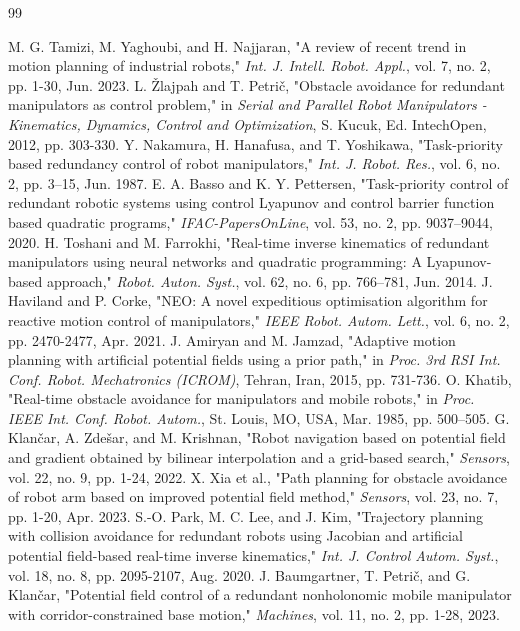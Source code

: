 \documentclass[letterpaper, 10 pt, conference]{ieeeconf}  %
\begin{document}
\begin{thebibliography}{99}
	
 M. G. Tamizi, M. Yaghoubi, and H. Najjaran, "A review of recent trend in motion planning of industrial robots," \textit{Int. J. Intell. Robot. Appl.}, vol. 7, no. 2, pp. 1-30, Jun. 2023.
 L. Žlajpah and T. Petrič, "Obstacle avoidance for redundant manipulators as control problem," in \textit{Serial and Parallel Robot Manipulators - Kinematics, Dynamics, Control and Optimization}, S. Kucuk, Ed. IntechOpen, 2012, pp. 303-330.
 Y. Nakamura, H. Hanafusa, and T. Yoshikawa, "Task-priority based redundancy control of robot manipulators," \textit{Int. J. Robot. Res.}, vol. 6, no. 2, pp. 3–15, Jun. 1987.
 E. A. Basso and K. Y. Pettersen, "Task-priority control of redundant robotic systems using control Lyapunov and control barrier function based quadratic programs," \textit{IFAC-PapersOnLine}, vol. 53, no. 2, pp. 9037–9044, 2020.
 H. Toshani and M. Farrokhi, "Real-time inverse kinematics of redundant manipulators using neural networks and quadratic programming: A Lyapunov-based approach," \textit{Robot. Auton. Syst.}, vol. 62, no. 6, pp. 766–781, Jun. 2014.
 J. Haviland and P. Corke, "NEO: A novel expeditious optimisation algorithm for reactive motion control of manipulators," \textit{IEEE Robot. Autom. Lett.}, vol. 6, no. 2, pp. 2470-2477, Apr. 2021.
 J. Amiryan and M. Jamzad, "Adaptive motion planning with artificial potential fields using a prior path," in \textit{Proc. 3rd RSI Int. Conf. Robot. Mechatronics (ICROM)}, Tehran, Iran, 2015, pp. 731-736.
 O. Khatib, "Real-time obstacle avoidance for manipulators and mobile robots," in \textit{Proc. IEEE Int. Conf. Robot. Autom.}, St. Louis, MO, USA, Mar. 1985, pp. 500–505.
 G. Klančar, A. Zdešar, and M. Krishnan, "Robot navigation based on potential field and gradient obtained by bilinear interpolation and a grid-based search," \textit{Sensors}, vol. 22, no. 9, pp. 1-24, 2022.
 X. Xia et al., "Path planning for obstacle avoidance of robot arm based on improved potential field method," \textit{Sensors}, vol. 23, no. 7, pp. 1-20, Apr. 2023.
 S.-O. Park, M. C. Lee, and J. Kim, "Trajectory planning with collision avoidance for redundant robots using Jacobian and artificial potential field-based real-time inverse kinematics," \textit{Int. J. Control Autom. Syst.}, vol. 18, no. 8, pp. 2095-2107, Aug. 2020.
 J. Baumgartner, T. Petrič, and G. Klančar, "Potential field control of a redundant nonholonomic mobile manipulator with corridor-constrained base motion," \textit{Machines}, vol. 11, no. 2, pp. 1-28, 2023.

\end{thebibliography}
\end{document}
